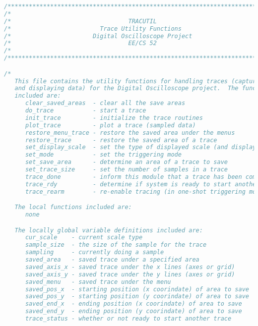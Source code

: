 \begin{lstlisting}[language=C]
/****************************************************************************/
/*                                                                          */
/*                                 TRACUTIL                                 */
/*                         Trace Utility Functions                          */
/*                       Digital Oscilloscope Project                       */
/*                                 EE/CS 52                                 */
/*                                                                          */
/****************************************************************************/

/*
   This file contains the utility functions for handling traces (capturing
   and displaying data) for the Digital Oscilloscope project.  The functions
   included are:
      clear_saved_areas  - clear all the save areas
      do_trace           - start a trace
      init_trace         - initialize the trace routines
      plot_trace         - plot a trace (sampled data)
      restore_menu_trace - restore the saved area under the menus
      restore_trace      - restore the saved area of a trace
      set_display_scale  - set the type of displayed scale (and display it)
      set_mode           - set the triggering mode
      set_save_area      - determine an area of a trace to save
      set_trace_size     - set the number of samples in a trace
      trace_done         - inform this module that a trace has been completed
      trace_rdy          - determine if system is ready to start another trace
      trace_rearm        - re-enable tracing (in one-shot triggering mode)

   The local functions included are:
      none

   The locally global variable definitions included are:
      cur_scale    - current scale type
      sample_size  - the size of the sample for the trace
      sampling     - currently doing a sample
      saved_area   - saved trace under a specified area
      saved_axis_x - saved trace under the x lines (axes or grid)
      saved_axis_y - saved trace under the y lines (axes or grid)
      saved_menu   - saved trace under the menu
      saved_pos_x  - starting position (x coorindate) of area to save
      saved_pos_y  - starting position (y coorindate) of area to save
      saved_end_x  - ending position (x coorindate) of area to save
      saved_end_y  - ending position (y coorindate) of area to save
      trace_status - whether or not ready to start another trace



\end{lstlisting}
